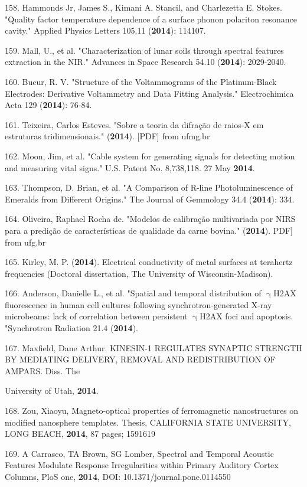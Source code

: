 158. Hammonds Jr, James S., Kimani A. Stancil, and Charlezetta E. Stokes. "Quality factor temperature dependence of a surface phonon polariton resonance cavity." Applied Physics Letters 105.11 (\textbf{2014}): 114107.

159. Mall, U., et al. "Characterization of lunar soils through spectral features extraction in the NIR." Advances in Space Research 54.10 (\textbf{2014}): 2029-2040.

160. Bucur, R. V. "Structure of the Voltammograms of the Platinum-Black Electrodes: Derivative Voltammetry and Data Fitting Analysis." Electrochimica Acta 129 (\textbf{2014}): 76-84.

161. Teixeira, Carlos Esteves. "Sobre a teoria da difra\c{c}\~{a}o de raios-X em estruturas tridimensionais." (\textbf{2014}). [PDF] from ufmg.br

162. Moon, Jim, et al. "Cable system for generating signals for detecting motion and measuring vital signs." U.S. Patent No. 8,738,118. 27 May \textbf{2014}.

163. Thompson, D. Brian, et al. "A Comparison of R-line Photoluminescence of Emeralds from Different Origins." The Journal of Gemmology 34.4 (\textbf{2014}): 334.

164. Oliveira, Raphael Rocha de. "Modelos de calibra\c{c}\~{a}o multivariada por NIRS para a predi\c{c}\~{a}o de caracter\'{i}sticas de qualidade da carne bovina." (\textbf{2014}). PDF] from ufg.br

165. Kirley, M. P. (\textbf{2014}). Electrical conductivity of metal surfaces at terahertz frequencies (Doctoral dissertation, The University of Wisconsin-Madison).

166. Anderson, Danielle L., et al. "Spatial and temporal distribution of ${\upgamma}$H2AX fluorescence in human cell cultures following synchrotron-generated X-ray microbeams: lack of correlation between persistent ${\upgamma}$H2AX foci and apoptosis. "Synchrotron Radiation 21.4 (\textbf{2014}).

167. Maxfield, Dane Arthur. KINESIN-1 REGULATES SYNAPTIC STRENGTH BY MEDIATING DELIVERY, REMOVAL AND REDISTRIBUTION OF AMPARS. Diss. The

University of Utah, \textbf{2014}.

168. Zou, Xiaoyu, Magneto-optical properties of ferromagnetic nanostructures on modified nanosphere templates. Thesis, CALIFORNIA STATE UNIVERSITY, LONG BEACH, \textbf{2014}, 87 pages; 1591619

169. A Carrasco, TA Brown, SG Lomber, Spectral and Temporal Acoustic Features Modulate Response Irregularities within Primary Auditory Cortex Columns, PloS one, \textbf{2014}, DOI: 10.1371/journal.pone.0114550

